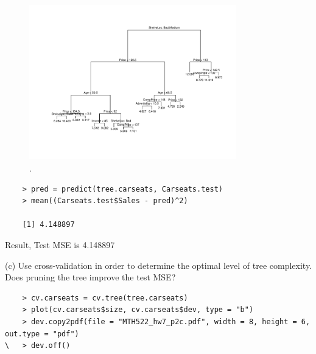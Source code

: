 \documentclass{article}
\begin{document}
\newpage

\begin{figure}[htb]
	\begin{center}
		\includegraphics[width=0.8\textwidth]{MTH522_hw7_p2a.pdf}
	\end{center}
	\caption{.}
	\label{fig:MTH522_hw7_p2a}
\end{figure}

\begin{program}
	\begin{verbatim}
	> pred = predict(tree.carseats, Carseats.test)
	> mean((Carseats.test$Sales - pred)^2)
	
	[1] 4.148897
	\end{verbatim}
\end{program}

Result, Test MSE is 4.148897

\newpage

(c) Use cross-validation in order to determine the optimal level of tree complexity. Does pruning the tree improve the test MSE?\\

\begin{program}
	\begin{verbatim}
	> cv.carseats = cv.tree(tree.carseats)
	> plot(cv.carseats$size, cv.carseats$dev, type = "b")
	> dev.copy2pdf(file = "MTH522_hw7_p2c.pdf", width = 8, height = 6, out.type = "pdf")
\	> dev.off()
	\end{verbatim}
\end{program}
\end{document}
